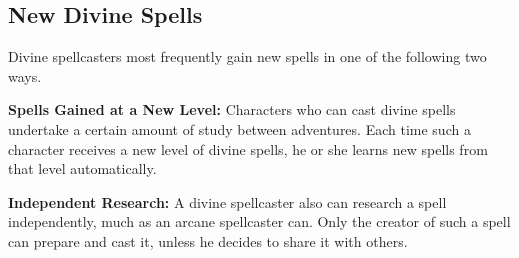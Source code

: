 \subsection{New Divine Spells}
Divine spellcasters most frequently gain new spells in one of the following two ways.

\textbf{Spells Gained at a New Level:} Characters who can cast divine spells undertake a certain amount of study between adventures. Each time such a character receives a new level of divine spells, he or she learns new spells from that level automatically.

\textbf{Independent Research:} A divine spellcaster also can research a spell independently, much as an arcane spellcaster can. Only the creator of such a spell can prepare and cast it, unless he decides to share it with others.